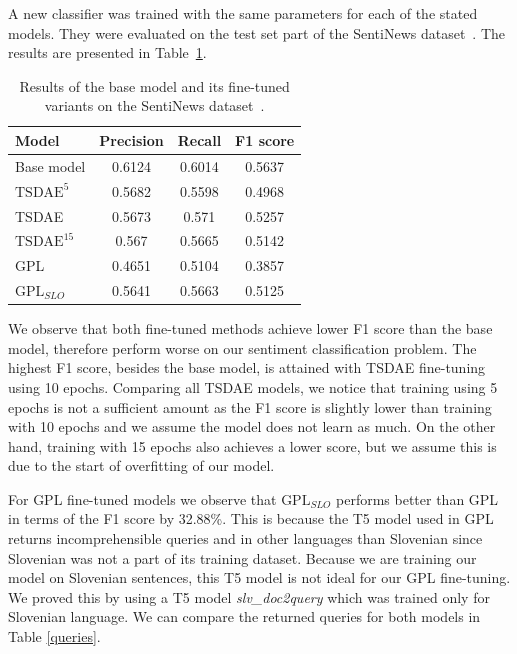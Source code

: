 \documentclass[fleqn,moreauthors,10pt]{ds_report}
\begin{document}
A new classifier was trained with the same parameters for each of the stated models. They were evaluated on the test set part of the SentiNews dataset~\cite{sentiNews}. The results are presented in Table~\ref{tab2}.

\begin{table}[!h]
	\footnotesize
	\begin{center}
		\begin{tabular}{ |l|c|c|c| }
		\hline
		\rowcolor{Blue}Model & Precision & Recall & F1 score\\
		\hline

		Base model & 0.6124 & 0.6014 & 0.5637\\
		\hline
		$\text{TSDAE}^{5}$ & 0.5682 & 0.5598 & 0.4968\\
		TSDAE &  0.5673 & 0.571 & 0.5257\\
		$\text{TSDAE}^{15}$ & 0.567 & 0.5665 & 0.5142\\
		\hline
		GPL & 0.4651 & 0.5104 & 0.3857\\
		$\text{GPL}_{SLO}$ & 0.5641 & 0.5663 & 0.5125\\

		\hline
		\end{tabular}
	\end{center}
\caption{Results of the base model and its fine-tuned variants on the SentiNews dataset~\cite{sentiNews}.}
\label{tab2}
\end{table}


We observe that both fine-tuned methods achieve lower F1 score than the base model, therefore perform
worse on our sentiment classification problem. The highest F1 score, besides the base model, is attained
with TSDAE fine-tuning using 10 epochs. Comparing all TSDAE models, we notice that training using 5 epochs
is not a sufficient amount as the F1 score is slightly lower than training with 10 epochs and we assume the model
does not learn as much. On the other hand, training with 15 epochs also achieves a lower score, but we
assume this is due to the start of overfitting of our model.

For GPL fine-tuned models we observe that $\text{GPL}_{SLO}$ performs better than GPL in terms of the F1 score
by 32.88\%.
This is because the T5 model used in GPL returns incomprehensible queries and in other languages than Slovenian
since Slovenian was not a part of its training dataset.
Because we are training our model on Slovenian sentences, this T5 model is not ideal for our GPL fine-tuning. We
proved this by using a T5 model {\it slv\_doc2query} which was trained only for Slovenian language.
We can compare the returned queries for both models in Table \ref*{queries}.
\end{document}
